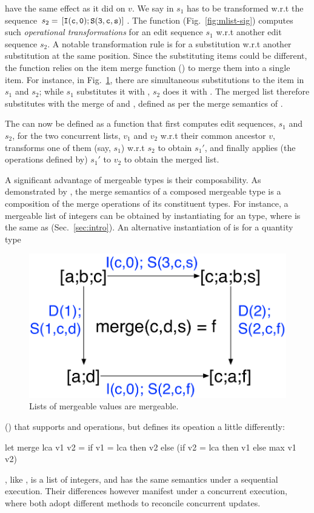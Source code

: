 \begin{itemize}
		have the same effect as it did on $v$. We say  in $s_1$ has to be
		transformed w.r.t the sequence $s_2 = \,{\tt [I(c,0);S(3,c,s)]}\,$.  The function
		 (Fig.~\ref{fig:mlist-sig}) computes such
		\emph{operational transformations} for an edit sequence $s_1$ w.r.t another
		edit sequence $s_2$. A notable transformation rule is for a substitution
		w.r.t another substitution at the same position. Since the substituting
		items could be different, the function relies on the item merge function
		() to merge them into a single item. For instance, in
		Fig.~\ref{fig:list-eg}, there are simultaneous substitutions to the item
		 in $s_1$ and $s_2$; while $s_1$ substitutes it with , $s_2$ does
		it with . The merged list therefore substitutes  with the merge
		of  and , defined as per the merge semantics of .
\end{itemize}
The  can now be defined as a function that first
computes edit sequences, $s_1$ and $s_2$, for the two concurrent
lists, $v_1$ and $v_2$ w.r.t their common ancestor $v$, transforms one
of them (say, $s_1$) w.r.t $s_2$ to obtain $s_1'$, and finally applies
(the operations defined by) $s_1'$ to $v_2$ to obtain the merged list.

A significant advantage of mergeable types is their composability. As
demonstrated by , the merge semantics of a composed mergeable
type is a composition of the merge operations of its constituent types.  For
instance, a mergeable list of integers can be obtained by
instantiating  for an  type, where  is
the same as  (Sec.~\ref{sec:intro}).
An alternative instantiation of  is for a quantity type
\begin{figure}
  \centering
  \includegraphics[scale=0.4]{Figures/list-eg}
  \caption{Lists of mergeable values are mergeable. }
  \label{fig:list-eg}
\end{figure}
() that supports  and 
operations, but defines its  opeation a little differently:
\begin{ocaml}
let merge lca v1 v2 = if v1 = lca then v2
    else (if v2 = lca then v1 else max v1 v2)
\end{ocaml}
, like , is a list of integers, and has
the same semantics under a sequential execution. Their differences
however manifest under a concurrent execution, where both adopt
different methods to reconcile concurrent updates.


